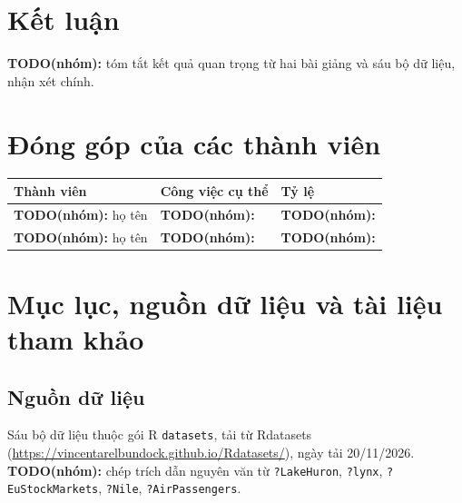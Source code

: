 \documentclass[12pt,a4paper]{article}
\newcommand{\TODO}[1]{{\color{red}\textbf{TODO(nhóm):} #1}}
\begin{document}
\section{Kết luận}
\TODO{tóm tắt kết quả quan trọng từ hai bài giảng và sáu bộ dữ liệu, nhận xét chính.}

\section{Đóng góp của các thành viên}
\begin{tabular}{@{}p{4cm}p{9cm}p{2cm}@{}}\toprule Thành viên & Công việc cụ thể & Tỷ lệ \\ \midrule
\TODO{họ tên} & \TODO{} & \TODO{} \\ \TODO{họ tên} & \TODO{} & \TODO{} \\ \bottomrule\end{tabular}

\section{Mục lục, nguồn dữ liệu và tài liệu tham khảo}
\subsection*{Nguồn dữ liệu}
Sáu bộ dữ liệu thuộc gói R \texttt{datasets}, tải từ Rdatasets (\url{https://vincentarelbundock.github.io/Rdatasets/}), ngày tải 20/11/2026. \TODO{chép trích dẫn nguyên văn từ \texttt{?LakeHuron}, \texttt{?lynx}, \texttt{?EuStockMarkets}, \texttt{?Nile}, \texttt{?AirPassengers}.}
\end{document}
